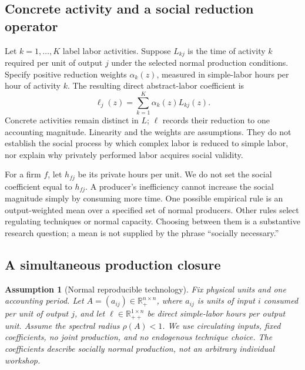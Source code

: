 \documentclass[11pt,letterpaper]{article}
\newtheorem{assumption}[proposition]{Assumption}
\newcommand{\R}{\mathbb R}
\begin{document}
\subsection{Concrete activity and a social reduction operator}
Let $k=1,\ldots,K$ label labor activities. Suppose $L_{kj}$ is the time of
activity $k$ required per unit of output $j$ under the selected normal
production conditions. Specify positive reduction weights
$\alpha_k(z)$, measured in simple-labor hours per hour of activity $k$.
The resulting direct abstract-labor coefficient is
\begin{equation}\label{eq:reduction}
 \ell_j(z)=\sum_{k=1}^K\alpha_k(z)L_{kj}(z).
\end{equation}
Concrete activities remain distinct in $L$; $\ell$ records their reduction
to one accounting magnitude. Linearity and the weights are assumptions.
They do not establish the social process by which complex labor is
reduced to simple labor, nor explain why privately performed labor
acquires social validity.

For a firm $f$, let $h_{fj}$ be its private hours per unit. We do not set
the social coefficient equal to $h_{fj}$. A producer's inefficiency
cannot increase the social magnitude simply by consuming more time.
One possible empirical rule is an output-weighted mean over a specified
set of normal producers. Other rules select regulating techniques or
normal capacity. Choosing between them is a substantive research
question; a mean is not supplied by the phrase ``socially necessary.''

\subsection{A simultaneous production closure}
\begin{assumption}[Normal reproducible technology]\label{ass:technology}
Fix physical units and one accounting period. Let
$A=(a_{ij})\in\R_+^{n\times n}$, where $a_{ij}$ is units of input $i$
consumed per unit of output $j$, and let
$\ell\in\R_{++}^{1\times n}$ be direct simple-labor hours per output
unit. Assume the spectral radius $\rho(A)<1$.
We use circulating inputs, fixed coefficients, no joint production,
and no endogenous technique choice. The coefficients describe socially
normal production, not an arbitrary individual workshop.
\end{assumption}
\end{document}
